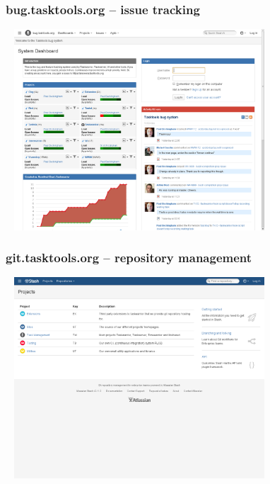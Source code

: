 \documentclass[t,handout]{beamer}
\begin{document}
\begin{frame}\frametitle{bug.tasktools.org -- issue tracking}
    \begin{center}
        \href{https://bug.tasktools.org/}{\includegraphics[width=10cm,height=7.5cm]{bug-tasktools-org.png}}
    \end{center}
\end{frame}

\begin{frame}\frametitle{git.tasktools.org -- repository management}
    \begin{center}
        \href{https://git.tasktools.org/}{\includegraphics[width=10cm,height=7.5cm]{git-tasktools-org.png}}
    \end{center}
\end{frame}
\end{document}
